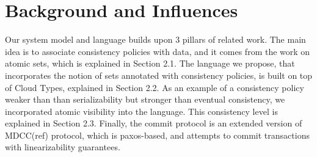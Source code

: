 

\section{Background and Influences}
Our system model and language builds upon 3 pillars of related work. The main
idea is to associate consistency policies with data, and it comes from the work on atomic sets, 
which is explained in Section 2.1. The language we propose, that incorporates the notion of sets
annotated with consistency policies, is built on top of Cloud Types, explained
in Section 2.2. As an example of a consistency policy weaker than than
serializability but stronger than eventual consistency, we incorporated atomic
visibility into the language. This consistency level is explained in Section
2.3. Finally, the commit protocol is an extended version of MDCC(ref) protocol,
which is paxos-based, and attempts to commit transactions with linearizability
guarantees.



